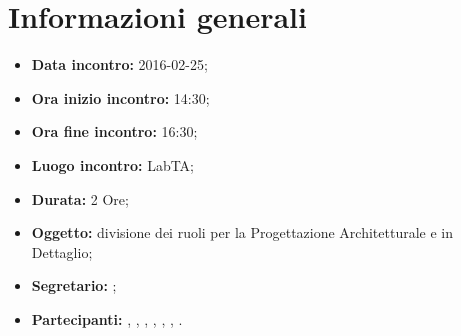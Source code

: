 \newpage
\section{Informazioni generali}
\begin{itemize}
\item \textbf{Data incontro:} 2016-02-25;
\item \textbf{Ora inizio incontro:} 14:30;
\item \textbf{Ora fine incontro:} 16:30;
\item \textbf{Luogo incontro:} LabTA;
\item \textbf{Durata:} 2 Ore;
\item \textbf{Oggetto:} divisione dei ruoli per la Progettazione Architetturale e in Dettaglio;
\item \textbf{Segretario:} \MP;
\item \textbf{Partecipanti:} \AF, \FB, \GN, \GR, \MV, \MP, \SM.

\end{itemize}
